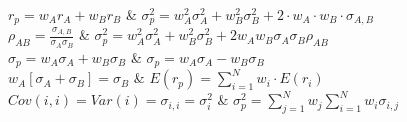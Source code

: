 $r_{p} = w_{A} r_{A} + w_{B}r_{B}$ & $ 
\sigma^{2}_{p} = w^{2}_{A} \sigma^{2}_{A} + w^{2}_{B} \sigma^{2}_{B} + 2\cdot w_{A} \cdot w_{B}\cdot \sigma_{A,B}$ \\

$\rho_{AB} = \frac{\sigma_{A,B}}{\sigma_{A}\sigma_{B}}$ & $ \sigma^{2}_{p} = w^{2}_{A} \sigma^{2}_{A} + w^{2}_{B} \sigma^{2}_{B} + 2w_{A}w_{B} \sigma_{A} \sigma_{B} \rho_{AB}$ \\

$\sigma_{p} = w_{A} \sigma_{A} + w_{B} \sigma_{B}$ & $ \sigma_{p} = w_{A} \sigma_{A} - w_{B} \sigma_{B}$ \\


$w_{A} [\sigma_{A} + \sigma_{B}] = \sigma_{B} $ & $E(r_{p}) = \sum_{i=1}^{N} w_{i} \cdot E(r_{i}) $\\

$ Cov(i,i) = Var(i) = \sigma_{i,i} = \sigma^{2}_{i}$ & $\sigma^{2}_{p} = \sum_{j=1}^{N} w_{j} \sum_{i=1}^{N} w_{i}\sigma_{i,j} $ \\